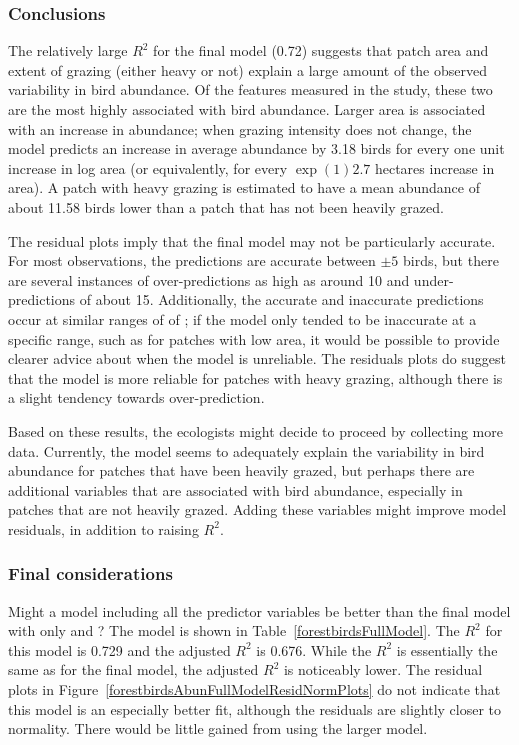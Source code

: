 \subsubsection{Conclusions}

The relatively large $R^2$ for the final model (0.72) suggests that patch area and extent of grazing (either heavy or not) explain a large amount of the observed variability in bird abundance. Of the features measured in the study, these two are the most highly associated with bird abundance. Larger area is associated with an increase in abundance; when grazing intensity does not change, the model predicts an increase in average abundance by 3.18 birds for every one unit increase in log area (or equivalently, for every $\exp(1) 2.7$ hectares increase in area). A patch with heavy grazing is estimated to have a mean abundance of about 11.58 birds lower than a patch that has not been heavily grazed. 

The residual plots imply that the final model may not be particularly accurate. For most observations, the predictions are accurate between $\pm 5$ birds, but there are several instances of over-predictions as high as around 10 and under-predictions of about 15. Additionally, the accurate and inaccurate predictions occur at similar ranges of of ; if the model only tended to be inaccurate at a specific range, such as for patches with low area, it would be possible to provide clearer advice about when the model is unreliable. The residuals plots do suggest that the model is more reliable for patches with heavy grazing, although there is a slight tendency towards over-prediction.

Based on these results, the ecologists might decide to proceed by collecting more data. Currently, the model seems to adequately explain the variability in bird abundance for patches that have been heavily grazed, but perhaps there are additional variables that are associated with bird abundance, especially in patches that are not heavily grazed. Adding these variables might improve model residuals, in addition to raising $R^2$. 

\subsubsection{Final considerations}

Might a model including all the predictor variables be better than the final model with only  and ? The model is shown in Table~\ref{forestbirdsFullModel}. The $R^2$ for this model is 0.729 and the adjusted $R^2$ is 0.676. While the $R^2$ is essentially the same as for the final model, the adjusted $R^2$ is noticeably lower. The residual plots in Figure~\ref{forestbirdsAbunFullModelResidNormPlots} do not indicate that this model is an especially better fit, although the residuals are slightly closer to normality. There would be little gained from using the larger model.

